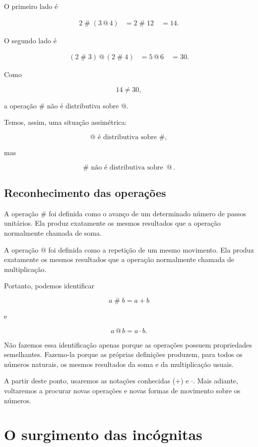 \documentclass[12pt,a4paper]{article}
\makeatletter
\newcommand{\mov}{\mathbin{\#}}
\newcommand{\rep}{\mathbin{@}}
\makeatother
\begin{document}
O primeiro lado é

\[
\begin{aligned}
2\mov(3\rep4)
&=2\mov12\
&=14.
\end{aligned}
\]

O segundo lado é

\[
\begin{aligned}
(2\mov3)\rep(2\mov4)
&=5\rep6\
&=30.
\end{aligned}
\]

Como

\[
14\neq30,
\]

a operação $\mov$ não é distributiva sobre $\rep$.

Temos, assim, uma situação assimétrica:

\[
\rep\text{ é distributiva sobre }\mov,
\]

mas

\[
\mov\text{ não é distributiva sobre }\rep.
\]

\subsection{Reconhecimento das operações}

A operação $\mov$ foi definida como o avanço de um determinado número
de passos unitários. Ela produz exatamente os mesmos resultados que a
operação normalmente chamada de soma.

A operação $\rep$ foi definida como a repetição de um mesmo movimento.
Ela produz exatamente os mesmos resultados que a operação normalmente
chamada de multiplicação.

Portanto, podemos identificar

\[
a\mov b=a+b
\]

e

\[
a\rep b=a\cdot b.
\]

Não fazemos essa identificação apenas porque as operações possuem
propriedades semelhantes. Fazemo-la porque as próprias definições
produzem, para todos os números naturais, os mesmos resultados da soma
e da multiplicação usuais.

A partir deste ponto, usaremos as notações conhecidas (+) e
$\cdot$. Mais adiante, voltaremos a procurar novas operações e novas
formas de movimento sobre os números.

\section{O surgimento das incógnitas}
\end{document}
